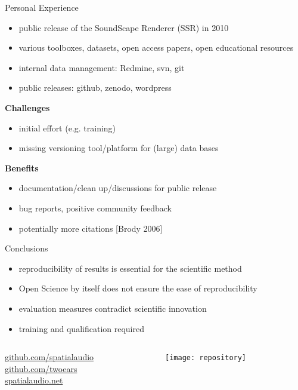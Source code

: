\documentclass{intbeamer}
\begin{document}
\begin{frame}{Personal Experience}

\begin{itemize}
\item public release of the SoundScape Renderer (SSR) in 2010
\item various toolboxes, datasets, open access papers, open educational resources
\item internal data management: Redmine, svn, git
\item public releases: github, zenodo, wordpress
\end{itemize}

\vfill

\textbf{Challenges}
\begin{itemize}
\item initial effort (e.g. training)
\item missing versioning tool/platform for (large) data bases
\end{itemize}

\vfill

\textbf{Benefits}
\begin{itemize}
\item documentation/clean up/discussions for public release
\item bug reports, positive community feedback
\item potentially more citations {\tiny [Brody 2006]}
\end{itemize}

\end{frame}


\begin{frame}{Conclusions}

\begin{itemize}
\item reproducibility of results is essential for the scientific method
\item Open Science by itself does not ensure the ease of reproducibility
\item evaluation measures contradict scientific innovation
\item training and qualification required
\end{itemize}

\vspace{8mm}

\begin{columns}[T]
\begin{column}{.45\linewidth}
{\large
\url{github.com/spatialaudio}\\[1ex]
\url{github.com/twoears}\\[1ex]
\url{spatialaudio.net}
}
\end{column}
\begin{column}{.4\linewidth}
\texttt{[image: repository]}
\end{column}
\end{columns}

\end{frame}
\end{document}
